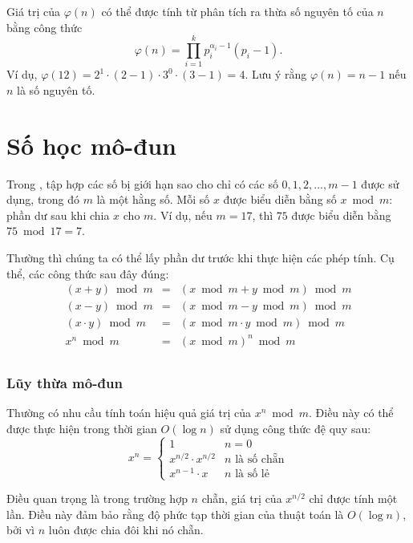Giá trị của $\varphi(n)$ có thể được tính
từ phân tích ra thừa số nguyên tố của $n$
bằng công thức
\[ \varphi(n) = \prod_{i=1}^k p_i^{\alpha_i-1}(p_i-1). \]
Ví dụ, $\varphi(12)=2^1 \cdot (2-1) \cdot 3^0 \cdot (3-1)=4$.
Lưu ý rằng $\varphi(n)=n-1$ nếu $n$ là số nguyên tố.

\section{Số học mô-đun}


Trong ,
tập hợp các số bị giới hạn sao cho
chỉ có các số $0,1,2,\ldots,m-1$ được sử dụng,
trong đó $m$ là một hằng số.
Mỗi số $x$ được
biểu diễn bằng số $x \bmod m$:
phần dư sau khi chia $x$ cho $m$.
Ví dụ, nếu $m=17$, thì $75$
được biểu diễn bằng $75 \bmod 17 = 7$.

Thường thì chúng ta có thể lấy phần dư trước khi thực hiện
các phép tính.
Cụ thể, các công thức sau đây đúng:
\[
\begin{array}{rcl}
(x+y) \bmod m & = & (x \bmod m + y \bmod m) \bmod m \\
(x-y) \bmod m & = & (x \bmod m - y \bmod m) \bmod m \\
(x \cdot y) \bmod m & = & (x \bmod m \cdot y \bmod m) \bmod m \\
x^n \bmod m & = & (x \bmod m)^n \bmod m \\
\end{array}
\]

\subsubsection{Lũy thừa mô-đun}

Thường có nhu cầu tính toán hiệu quả
giá trị của $x^n \bmod m$.
Điều này có thể được thực hiện trong thời gian $O(\log n)$
sử dụng công thức đệ quy sau:
\begin{equation*}
    x^n = \begin{cases}
               1        & n = 0\\
               x^{n/2} \cdot x^{n/2} & \text{$n$ là số chẵn}\\
               x^{n-1} \cdot x & \text{$n$ là số lẻ}
           \end{cases}
\end{equation*}

Điều quan trọng là trong trường hợp $n$ chẵn,
giá trị của $x^{n/2}$ chỉ được tính một lần.
Điều này đảm bảo rằng độ phức tạp thời gian của
thuật toán là $O(\log n)$, bởi vì $n$ luôn được chia đôi
khi nó chẵn.

